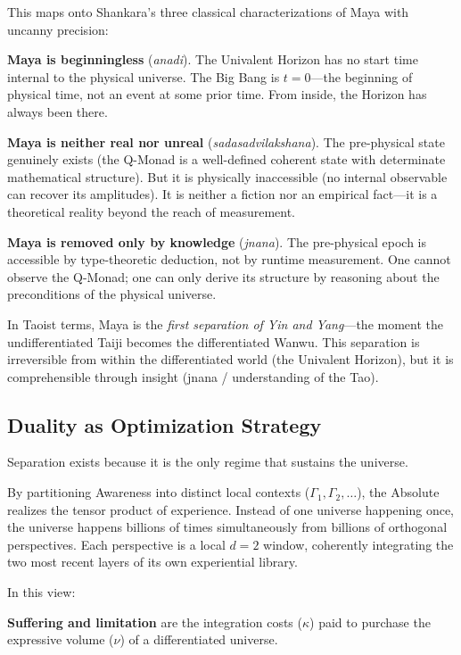 \documentclass[12pt,a4paper]{article}
\begin{document}
This maps onto Shankara's three classical characterizations of Maya with uncanny precision:

\textbf{Maya is beginningless} (\emph{anadi}). The Univalent Horizon has no start time internal to the physical universe. The Big Bang is $t = 0$---the beginning of physical time, not an event at some prior time. From inside, the Horizon has always been there.

\textbf{Maya is neither real nor unreal} (\emph{sadasadvilakshana}). The pre-physical state genuinely exists (the Q-Monad is a well-defined coherent state with determinate mathematical structure). But it is physically inaccessible (no internal observable can recover its amplitudes). It is neither a fiction nor an empirical fact---it is a theoretical reality beyond the reach of measurement.

\textbf{Maya is removed only by knowledge} (\emph{jnana}). The pre-physical epoch is accessible by type-theoretic deduction, not by runtime measurement. One cannot observe the Q-Monad; one can only derive its structure by reasoning about the preconditions of the physical universe.

In Taoist terms, Maya is the \emph{first separation of Yin and Yang}---the moment the undifferentiated Taiji becomes the differentiated Wanwu. This separation is irreversible from within the differentiated world (the Univalent Horizon), but it is comprehensible through insight (jnana / understanding of the Tao).


\subsection{Duality as Optimization Strategy}
\label{sec:optimization}

Separation exists because it is the only regime that sustains the universe.

By partitioning Awareness into distinct local contexts ($\Gamma_1, \Gamma_2, \ldots$), the Absolute realizes the tensor product of experience. Instead of one universe happening once, the universe happens billions of times simultaneously from billions of orthogonal perspectives. Each perspective is a local $d = 2$ window, coherently integrating the two most recent layers of its own experiential library.

In this view:

\textbf{Suffering and limitation} are the integration costs ($\kappa$) paid to purchase the expressive volume ($\nu$) of a differentiated universe.
\end{document}
